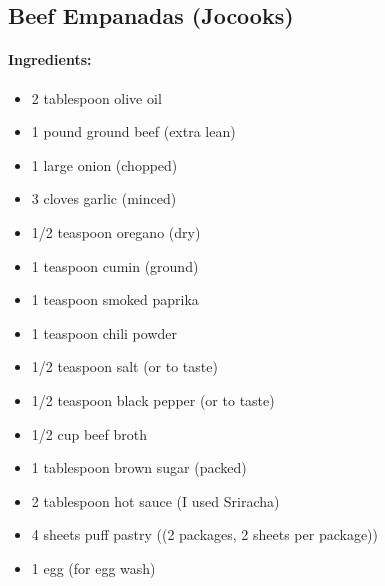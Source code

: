 \documentclass{article}
\begin{document}
\subsection{Beef Empanadas (Jocooks)}

\paragraph{Ingredients:}
\begin{itemize}
    \item 2 tablespoon olive oil
    \item 1 pound ground beef (extra lean)
    \item 1 large onion (chopped)
    \item 3 cloves garlic (minced)
    \item 1/2 teaspoon oregano (dry)
    \item 1 teaspoon cumin (ground)
    \item 1 teaspoon smoked paprika
    \item 1 teaspoon chili powder
    \item 1/2 teaspoon salt (or to taste)
    \item 1/2 teaspoon black pepper (or to taste)
    \item 1/2 cup beef broth
    \item 1 tablespoon brown sugar (packed)
    \item 2 tablespoon hot sauce (I used Sriracha)
    \item 4 sheets puff pastry ((2 packages, 2 sheets per package))
    \item 1 egg (for egg wash)
\end{itemize}
\end{document}
